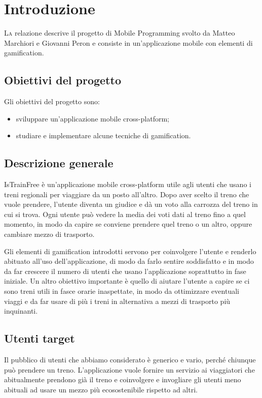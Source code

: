 \chapter{Introduzione\label{sec:introduzione}}
\lettrine[findent=1.5em]{L}a relazione descrive il progetto di Mobile Programming svolto da Matteo Marchiori e Giovanni Peron e consiste in un'applicazione mobile con elementi di gamification.

\section{Obiettivi del progetto\label{sec:obiettivi}}
Gli obiettivi del progetto sono:
\begin{itemize}
    \item sviluppare un'applicazione mobile cross-platform;
    \item studiare e implementare alcune tecniche di gamification.
\end{itemize}

\section{Descrizione generale\label{sec:descrizione}}
IsTrainFree è un'applicazione mobile cross-platform utile agli utenti che usano i treni regionali per viaggiare da un posto all'altro. Dopo aver scelto il treno che vuole prendere, l'utente diventa un giudice e dà un voto alla carrozza del treno in cui si trova. Ogni utente può vedere la media dei voti dati al treno fino a quel momento, in modo da capire se conviene prendere quel treno o un altro, oppure cambiare mezzo di trasporto.

Gli elementi di gamification introdotti servono per coinvolgere l'utente e renderlo abituato all'uso dell'applicazione, di modo da farlo sentire soddisfatto e in modo da far crescere il numero di utenti che usano l'applicazione soprattutto in fase iniziale.
Un altro obiettivo importante è quello di aiutare l'utente a capire se ci sono treni utili in fasce orarie inaspettate, in modo da ottimizzare eventuali viaggi e da far usare di più i treni in alternativa a mezzi di trasporto più inquinanti.

\section{Utenti target}
Il pubblico di utenti che abbiamo considerato è generico e vario, perché chiunque può prendere un treno.
L'applicazione vuole fornire un servizio ai viaggiatori che abitualmente prendono già il treno e coinvolgere e invogliare gli utenti meno abituali ad usare un mezzo più ecosostenibile rispetto ad altri.